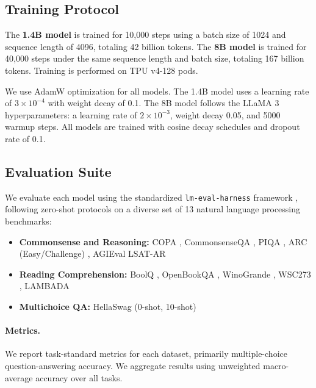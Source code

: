 \subsection{Training Protocol}\label{sec:training}

The \textbf{1.4B model} is trained for 10{,}000 steps using a batch size of 1024 and sequence length of 4096, totaling 42 billion tokens.
The \textbf{8B model} is trained for 40{,}000 steps under the same sequence length and batch size, totaling 167 billion tokens.
Training is performed on TPU v4-128 pods.

We use AdamW optimization for all models.
The 1.4B model uses a learning rate of $3 \times 10^{-4}$ with weight decay of 0.1.
The 8B model follows the LLaMA 3 hyperparameters: a learning rate of $2 \times 10^{-3}$, weight decay 0.05, and 5000 warmup steps.
All models are trained with cosine decay schedules and dropout rate of 0.1.

\subsection{Evaluation Suite}\label{sec:evaluation}

We evaluate each model using the standardized \texttt{lm-eval-harness} framework \citep{biderman2024lessons}, following zero-shot protocols on a diverse set of 13 natural language processing benchmarks:
\begin{itemize}[leftmargin=1.35em,topsep=2pt,itemsep=1pt]
\item \textbf{Commonsense and Reasoning:} COPA \citep{roemmele2011choice}, CommonsenseQA \citep{talmor2018commonsenseqa}, PIQA \citep{bisk2020piqa}, ARC (Easy/Challenge) \citep{clark2018think}, AGIEval LSAT-AR \citep{zhong2023agieval}
\item \textbf{Reading Comprehension:} BoolQ \citep{clark2019boolq}, OpenBookQA \citep{mihaylov2018suit}, WinoGrande \citep{sakaguchi2021winogrande}, WSC273 \citep{levesque2012winograd}, LAMBADA \citep{paperno2016lambada}
\item \textbf{Multichoice QA:} HellaSwag (0-shot, 10-shot) \citep{zellers2019hellaswag}
\end{itemize}

\paragraph{Metrics.}
We report task-standard metrics for each dataset, primarily multiple-choice question-answering accuracy.
We aggregate results using unweighted macro-average accuracy over all tasks.
